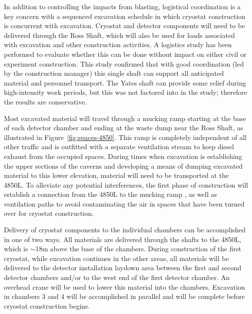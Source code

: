 In addition to controlling the impacts from blasting, logistical coordination is a key concern with a sequenced excavation schedule in which cryostat construction is concurrent with excavation. %
Cryostat and detector components will need to be delivered through the Ross Shaft, which will also be used for loads associated with excavation and other construction activities. A logistics study\cite{lbnf-logistics} has been performed to evaluate whether this can be done without impact on either civil or experiment construction.  This study confirmed that with good coordination (led by the construction manager) this single shaft can support all anticipated material and personnel transport. %
The Yates shaft can provide some relief during high-intensity work periods, but this was not factored into %
in the study; therefore the results are conservative. %

Most excavated material will travel through a mucking ramp starting at the base of each detector chamber and ending at the waste dump near the Ross Shaft, as illustrated in Figure~\ref{fig:spaces-4850}. This %
ramp is completely independent of all other traffic and is outfitted with %
a separate ventilation stream to keep diesel exhaust from %
the occupied spaces. During times when excavation is establishing the upper sections of the caverns and developing a means of dumping excavated material to this lower elevation, material will need to be transported at the 4850L. 
 To alleviate any potential interferences, the first phase of construction will establish a connection from the 4850L to the mucking ramp  , as well as ventilation paths to avoid contaminating the air in spaces that have been turned over for cryostat construction. 

Delivery of cryostat components to the individual chambers can be accomplished in one of two ways. 
 All materials are delivered through the shafts to the 4850L, which is $\sim$18m above the base of the chambers. During construction of the first cryostat, while excavation continues in the other areas, all materials will be delivered to the detector installation laydown area between the first and second detector chambers and/or to the west end of the first detector chamber. An overhead crane will be used to lower this material into the chambers. Excavation in chambers 3 and 4 will be accomplished in parallel and will be complete before cryostat construction begins. %

